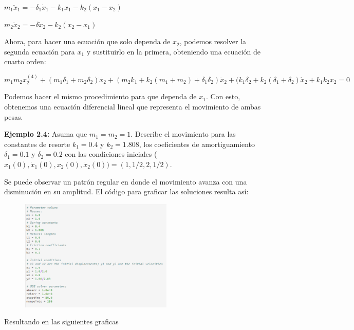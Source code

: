 \documentclass[a4paper]{article}
\begin{document}
\begin{center}
$m_1\ddot x_1 = - \delta_1\dot x_1 - k_1x_1 - k_2(x_1 - x_2)$

$m_2 \ddot x_2 = - \delta\dot x_2 - k_2(x_2 - x_1)$
\end{center}

Ahora, para hacer una ecuación que solo dependa de $x_2$, podemos resolver la segunda ecuación para $x_1$ y sustituirlo en la primera, obteniendo una ecuación de cuarto orden:

\begin{center}
$m_1m_2x_2^{(4)} + (m_1\delta_1 + m_2\delta_2)\dddot x_2 + (m_2k_1 + k_2(m_1 + m_2) + \delta_1\delta_2)\ddot x_2 + (k_1\delta_2 + k_2(\delta_1 + \delta_2)\dot x_2 + k_1k_2x_2 = 0$

Podemos hacer el mismo procedimiento para que dependa de $x_1$. Con esto, obtenemos una ecuación diferencial lineal que representa el movimiento de ambas pesas. 

\textbf{Ejemplo 2.4:} Asuma que $m_1 = m_2 = 1$. Describe el movimiento para las constantes de resorte $k_1 = 0.4$ y $k_2 = 1.808$, los coeficientes de amortiguamiento $\delta_1 = 0.1$ y $\delta_2 = 0.2$ con las condiciones iniciales ($x_1(0), \dot x_1(0), x_2(0), \dot x_2(0)) = (1,1/2,2,1/2)$.

Se puede observar un patrón regular en donde el movimiento avanza con una disminución en su amplitud. El código para graficar las soluciones resulta así:

\begin{figure}[ht!]
 \centering
  \includegraphics[width=0.65\textwidth]{Codigo2_3.PNG}
\end{figure}
 
\pagebreak

\raggedright Resultando en las siguientes graficas


\end{center}
\end{document}
